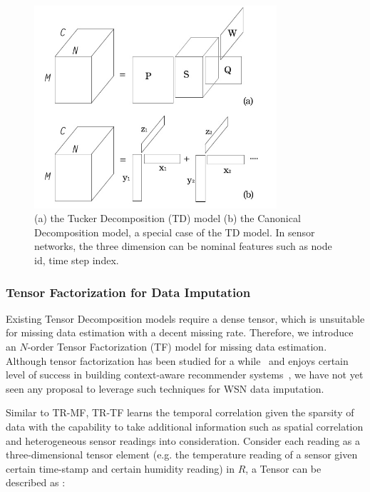 \begin{figure}[h] 
\includegraphics[width=9cm]{tf.jpg} 
\caption{ (a) the Tucker Decomposition (TD) model (b) the Canonical Decomposition model, a special case of the TD model. In sensor networks, the three dimension can be nominal features such as node id, time step index.} 
\label{fig:tf:tuckcanon} 
\end{figure}

\subsubsection{Tensor Factorization for Data Imputation} \label{sec:tfmissing}

Existing Tensor Decomposition models require a dense tensor, which is unsuitable for missing data estimation with a decent missing rate. 
Therefore, we introduce an $N$-order Tensor Factorization (TF) model for missing data estimation. Although tensor factorization has been studied for a while~\cite{kolda2009tensor,bergqvist2010higher} and enjoys certain level of success in building context-aware recommender systems~\cite{karatzoglou2010multiverse,rendle2010pairwise,gantner2010factorization}, we have not yet seen any proposal to leverage such techniques for WSN data imputation.

Similar to TR-MF, TR-TF learns the temporal correlation given the sparsity of data with the capability to take additional information such as spatial correlation and heterogeneous sensor readings into consideration.
Consider each reading as a three-dimensional tensor element (e.g. the temperature reading of a sensor given certain time-stamp and certain humidity reading) in $R$, a Tensor can be described as :

